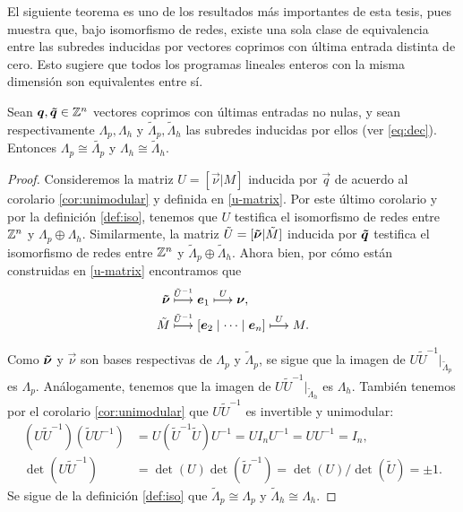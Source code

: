 El siguiente teorema es uno de los resultados más importantes de esta tesis, pues muestra que, bajo
isomorfismo de redes, existe una sola clase de equivalencia entre las subredes inducidas por
vectores coprimos con última entrada distinta de cero. Esto sugiere que todos los
programas lineales enteros con la misma dimensión son equivalentes entre sí.
\begin{theorem}
	\label{th:equiv}
	Sean $\boldsymbol{q}, \boldsymbol{\tilde{q}} \in \mathbb{Z}^n$ vectores coprimos con últimas entradas no nulas, y sean
	respectivamente $\Lambda_p, \Lambda_h$ y $\tilde{\Lambda}_p, \tilde{\Lambda}_h$ las subredes
	inducidas por ellos (ver \eqref{eq:dec}). Entonces $\Lambda_p \cong \tilde{\Lambda_p}$ y
	$\Lambda_h \cong \tilde{\Lambda}_h$.
\end{theorem}
\begin{proof}
	Consideremos la matriz $U = [\vec{\nu} | M]$ inducida por $\vec{q}$ de acuerdo al corolario
	\ref{cor:unimodular} y definida en \eqref{u-matrix}. Por este último corolario y por la
	definición \ref{def:iso}, tenemos que $U$ testifica el isomorfismo de redes entre $\mathbb{Z}^n$ y
	$\Lambda_p \oplus \Lambda_h$. Similarmente, la matriz $\tilde{U} = [\boldsymbol{\tilde{\nu}} | \tilde{M}]$
	inducida por $\boldsymbol{\tilde{q}}$ testifica el isomorfismo de redes entre $\mathbb{Z}^n$ y $\tilde{\Lambda}_p
	\oplus \tilde{\Lambda}_h$. Ahora bien, por cómo están construidas en \eqref{u-matrix}
	encontramos que
	\begin{subequations}
		\begin{align}
			\boldsymbol{\tilde{\nu}} &\overset{\tilde{U}^{-1}}{\longmapsto} \boldsymbol{e}_1 \overset{U}{\longmapsto}
			\boldsymbol{\nu}, \label{eq:equiv:1} \\
			\tilde{M} &\overset{\tilde{U}^{-1}}{\longmapsto} [\boldsymbol{e}_2 \mid \cdots \mid \boldsymbol{e}_n]
			\overset{U}{\longmapsto} M \label{eq:equiv:2}.
		\end{align}
	\end{subequations}

	Como $\boldsymbol{\tilde{\nu}}$ y $\vec{\nu}$ son bases respectivas de $\Lambda_p$ y $\tilde{\Lambda}_p$, se
	sigue que la imagen de $U\tilde{U}^{-1}\big|_{\tilde{\Lambda}_p}$ es $\Lambda_p$. Análogamente,
	tenemos que la imagen de $U\tilde{U}^{-1}\big|_{\tilde{\Lambda}_h}$ es $\Lambda_h$. También
	tenemos por el corolario \ref{cor:unimodular} que $U\tilde{U}^{-1}$ es invertible y unimodular:
	\begin{align*}
		(U\tilde{U}^{-1})(\tilde{U}U^{-1}) &= U(\tilde{U}^{-1}\tilde{U})U^{-1} = UI_nU^{-1} =
		UU^{-1} = I_n, \\
		\det{(U\tilde{U}^{-1})} &= \det{(U)}\det{(\tilde{U}^{-1})} = \det{(U)}/\det{(\tilde{U})} = \pm 1.
	\end{align*}
	Se sigue de la definición \ref{def:iso} que $\tilde{\Lambda}_p \cong \Lambda_p$ y
	$\tilde{\Lambda}_h \cong \Lambda_h$.
\end{proof}

